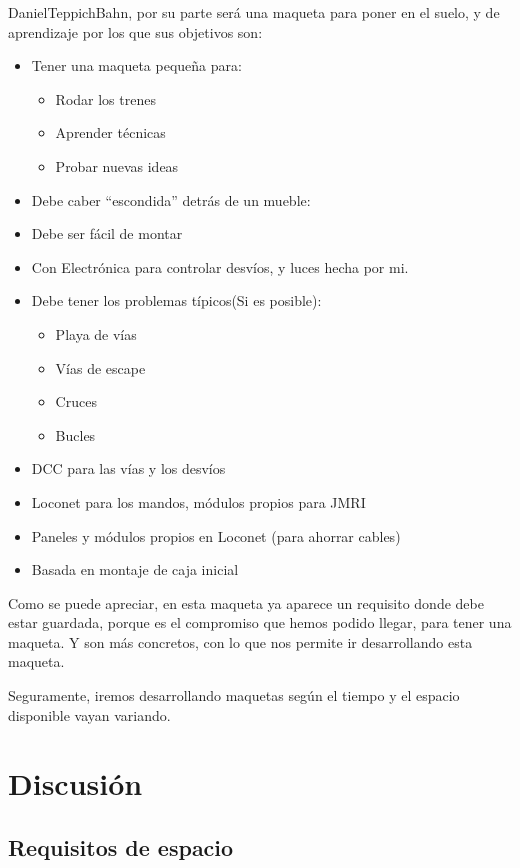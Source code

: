 DanielTeppichBahn, por su parte será una maqueta para poner en el suelo, y de aprendizaje por los que sus
objetivos son:
\begin{itemize}
    \item Tener una maqueta pequeña para:

          \begin{itemize}
              \item Rodar los trenes
              \item Aprender técnicas
              \item Probar nuevas ideas
          \end{itemize}
    \item Debe caber “escondida” detrás de un mueble:
    \item Debe ser fácil de montar
    \item Con Electrónica para controlar desvíos, y luces hecha por mi.
    \item Debe tener los problemas típicos(Si es posible):

          \begin{itemize}
              \item Playa de vías
              \item Vías de escape
              \item Cruces
              \item Bucles
          \end{itemize}
    \item DCC para las vías y los desvíos
    \item Loconet para los mandos, módulos propios para JMRI
    \item Paneles y módulos propios en Loconet (para ahorrar cables)
    \item Basada en montaje de caja inicial
\end{itemize}

Como se puede apreciar, en esta maqueta ya aparece un requisito donde debe estar guardada, porque es el compromiso
que hemos podido llegar, para tener una maqueta. Y son más concretos, con lo que nos permite ir desarrollando
esta maqueta.

Seguramente, iremos desarrollando maquetas según el tiempo y el espacio disponible vayan variando.
\section{Discusión}
\subsection{Requisitos de espacio}

